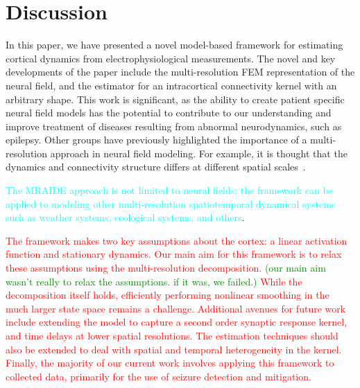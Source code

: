\documentclass[journal]{IEEEtran}
\newcommand{\mike}[1]{\textcolor{red}{#1}}
\newcommand{\dean}[1]{\textcolor{green}{#1}}
\newcommand{\parham}[1]{\textcolor{blue}{#1}}
\newcommand{\ken}[1]{\textsf{\emph{\textbf{\textcolor{magenta}{#1}}}}}
\newcommand{\cut}[1]{\textcolor{cyan}{#1}}
\begin{document}
\section{Discussion}
In this paper, we have presented a novel model-based framework for estimating cortical dynamics from electrophysiological measurements. The novel and key developments of the paper include the multi-resolution FEM representation of the neural field, and the estimator for an intracortical connectivity kernel with an arbitrary shape. This work is significant, as the ability to create patient specific neural field models has the potential to contribute to our understanding and improve treatment of diseases resulting from abnormal neurodynamics, such as epilepsy. Other groups have previously highlighted the importance of a multi-resolution approach in neural field modeling. For example, it is thought that the dynamics and connectivity structure differs at different spatial scales~\cite{Qubbaj2009}.

\cut{The MRAIDE approach is not limited to neural fields; the framework can be applied to modeling other multi-resolution spatiotemporal dynamical systems such as weather systems, ecological systems, and others\cite{Wikle2002,Xu2005,Fort2008}}. 

\mike{The framework makes two key assumptions about the cortex: a linear activation function and stationary dynamics. Our main aim for this framework is to relax these assumptions using the multi-resolution decomposition. \dean{(our main aim wasn't really to relax the assumptions. if it was, we failed.)} While the decomposition itself holds, efficiently performing nonlinear smoothing in the much larger state space remains a challenge. Additional avenues for future work include extending the model to capture a second order synaptic response kernel, and time delays at lower spatial resolutions.  The estimation techniques should also be extended to deal with spatial and temporal heterogeneity in the kernel. Finally, the majority of our current work involves applying this framework to collected data, primarily for the use of seizure detection and mitigation.}
\end{document}
